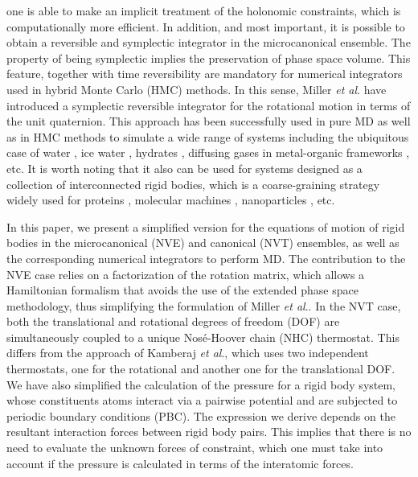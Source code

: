 \documentclass[aip,jcp,reprint,amsmath,amssymb]{revtex4-1}
\begin{document}
one is able to make an implicit treatment of the holonomic constraints, which is computationally more efficient. In addition, and most important, it is possible to obtain a reversible and symplectic integrator in the microcanonical ensemble. The property of being symplectic implies the preservation of phase space volume. This feature, together with time reversibility are mandatory for numerical integrators used in hybrid Monte Carlo (HMC) methods.\cite{Duane1987} In this sense, Miller \textit{et al}.\cite{Miller2002} have introduced a symplectic reversible integrator for the rotational motion in terms of the unit quaternion. This approach has been successfully used in pure MD as well as in HMC methods to simulate a wide range of systems including the ubiquitous case of water \cite{Sakamaki2011,Reinhardt2012,Palmer2014,Gonzales2014}, ice water \cite{Geiger2014}, hydrates \cite{Tribello2009,Gorman2012}, diffusing gases in metal-organic frameworks \citep{Ghoufi2010}, etc. It is worth noting that it also can be used for systems designed as a collection of interconnected rigid bodies, which is a coarse-graining strategy widely used for proteins \citep{Terada2003}, molecular machines \citep{Akimov2008,Konyukhov2010}, nanoparticles \cite{Knorowski2012,Patra2013}, etc.
 
In this paper, we present a simplified version for the equations of motion of rigid bodies in the microcanonical (NVE) and canonical (NVT) ensembles, as well as the corresponding numerical integrators to perform MD. The contribution to the NVE case relies on a factorization of the rotation matrix, which allows a Hamiltonian formalism that avoids the use of the extended phase space methodology, thus simplifying the formulation of Miller \textit{et al}.\cite{Miller2002}. In the NVT case, both the translational and rotational degrees of freedom (DOF) are simultaneously coupled to a unique Nos\'{e}-Hoover chain (NHC) thermostat. This differs from the approach of Kamberaj \textit{et al}.\cite{Kamberaj2005}, which uses two independent thermostats, one for the rotational and another one for the translational DOF. We have also simplified the calculation of the pressure for a rigid body system, whose constituents atoms interact via a pairwise potential and are subjected to periodic boundary conditions (PBC). The expression we derive depends on the resultant interaction forces between rigid body pairs. This implies that there is no need to evaluate the unknown forces of constraint, which one must take into account if the pressure is calculated in terms of the interatomic forces. 
\end{document}

